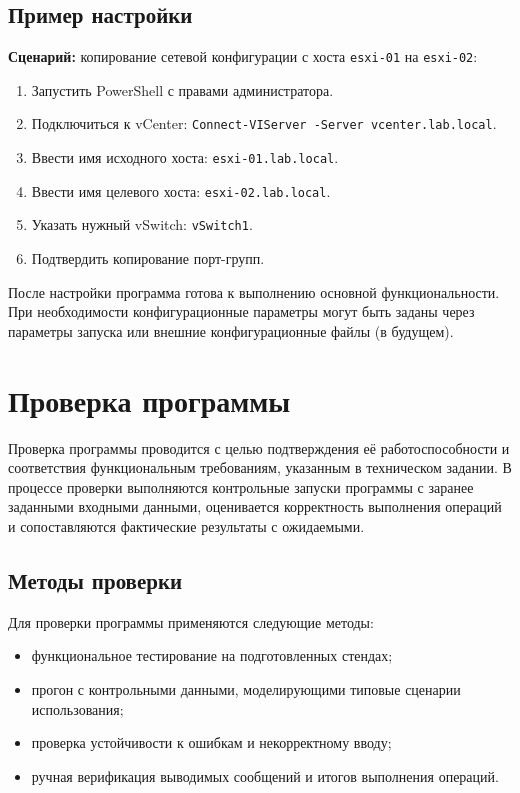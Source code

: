 \subsection{Пример настройки}
\textbf{Сценарий:} копирование сетевой конфигурации с хоста \texttt{esxi-01} на \texttt{esxi-02}:
\begin{enumerate}
  \item Запустить PowerShell с правами администратора.
  \item Подключиться к vCenter: \texttt{Connect-VIServer -Server vcenter.lab.local}.
  \item Ввести имя исходного хоста: \texttt{esxi-01.lab.local}.
  \item Ввести имя целевого хоста: \texttt{esxi-02.lab.local}.
  \item Указать нужный vSwitch: \texttt{vSwitch1}.
  \item Подтвердить копирование порт-групп.
\end{enumerate}

После настройки программа готова к выполнению основной функциональности. При необходимости конфигурационные параметры могут быть заданы через параметры запуска или внешние конфигурационные файлы (в будущем).

\newpage
\section{Проверка программы}

Проверка программы проводится с целью подтверждения её работоспособности и соответствия функциональным требованиям, указанным в техническом задании. В процессе проверки выполняются контрольные запуски программы с заранее заданными входными данными, оценивается корректность выполнения операций и сопоставляются фактические результаты с ожидаемыми.

\subsection{Методы проверки}

Для проверки программы применяются следующие методы:
\begin{itemize}
  \item функциональное тестирование на подготовленных стендах;
  \item прогон с контрольными данными, моделирующими типовые сценарии использования;
  \item проверка устойчивости к ошибкам и некорректному вводу;
  \item ручная верификация выводимых сообщений и итогов выполнения операций.
\end{itemize}


